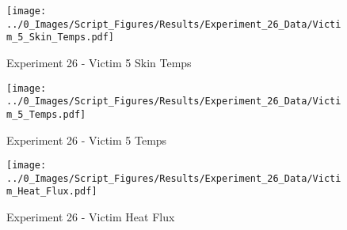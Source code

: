 	\clearpage

	\begin{figure}[H]
		\centering
		\texttt{[image: ../0\_Images/Script\_Figures/Results/Experiment\_26\_Data/Victim\_5\_Skin\_Temps.pdf]}
		\caption[]{Experiment 26 - Victim 5 Skin Temps}
	\end{figure}
 

	\begin{figure}[H]
		\centering
		\texttt{[image: ../0\_Images/Script\_Figures/Results/Experiment\_26\_Data/Victim\_5\_Temps.pdf]}
		\caption[]{Experiment 26 - Victim 5 Temps}
	\end{figure}
 
	\clearpage

	\begin{figure}[H]
		\centering
		\texttt{[image: ../0\_Images/Script\_Figures/Results/Experiment\_26\_Data/Victim\_Heat\_Flux.pdf]}
		\caption[]{Experiment 26 - Victim Heat Flux}
	\end{figure}
 

